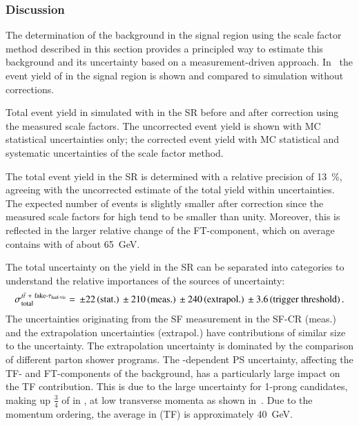 \subsubsection{Discussion}

The determination of the \ttbarFakes background in the \hadhad signal
region using the scale factor method described in this section
provides a principled way to estimate this background and its
uncertainty based on a measurement-driven
approach. In~ the event yield of \ttbarFakes
in the \hadhad signal region is shown and compared to \ttbar
simulation without corrections.

\begin{table}[htbp]
  \centering

  

  \caption{Total event yield in simulated \ttbar with \faketauhadvis
    in the \hadhad SR before and after correction using the measured
    scale factors. The uncorrected event yield is shown with MC
    statistical uncertainties only; the corrected event yield with MC
    statistical and systematic uncertainties of the scale factor method.}

  \label{tab:ttbarSF_yields}
\end{table}

The total \ttbarFakes event yield in the \hadhad SR is determined with
a relative precision of \SI{13}{\percent}, agreeing with the
uncorrected estimate of the total yield within uncertainties. The
expected number of \ttbarFakes events is slightly smaller after
correction since the measured scale factors for high \pT
\faketauhadvis tend to be smaller than unity. Moreover, this is
reflected in the larger relative change of the FT-component, which on
average contains \faketauhadvis with \pT of about \SI{65}{\GeV}.

The total uncertainty on the \ttbarFakes yield in the SR can be
separated into categories to understand the relative importances of
the sources of uncertainty:
\begin{align*}
  \sigma_\text{total}^{\ttbarFakes} = \valuesep\numerrt{22}{stat.}%
  \valuesep\numerrt{210}{meas.}%
  \valuesep\numerrt{240}{extrapol.}%
  \valuesep\numerrt{3.6}{trigger threshold} \,\text{.}
\end{align*}
The uncertainties originating from the SF measurement in the SF-CR
(meas.) and the extrapolation uncertainties (extrapol.) have
contributions of similar size to the uncertainty. The extrapolation
uncertainty is dominated by the comparison of different parton shower
programs. The \faketauhadvis \pT-dependent PS uncertainty, affecting
the TF- and FT-components of the background, has a particularly large
impact on the TF contribution. This is due to the large uncertainty
for 1-prong \faketauhadvis candidates, making up $\frac{3}{4}$ of
\faketauhadvis in \ttbar, at low transverse momenta as shown
in~. Due to the momentum ordering,
the average \faketauhadvis \pT in \ttbarFakes (TF) is approximately
\SI{40}{\GeV}.

